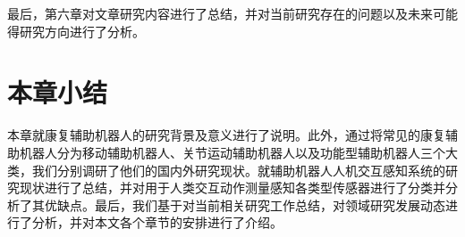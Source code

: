 最后，第六章对文章研究内容进行了总结，并对当前研究存在的问题以及未来可能得研究方向进行了分析。

\section{本章小结}
本章就康复辅助机器人的研究背景及意义进行了说明。此外，通过将常见的康复辅助机器人分为移动辅助机器人、关节运动辅助机器人以及功能型辅助机器人三个大类，我们分别调研了他们的国内外研究现状。就辅助机器人人机交互感知系统的研究现状进行了总结，并对用于人类交互动作测量感知各类型传感器进行了分类并分析了其优缺点。最后，我们基于对当前相关研究工作总结，对领域研究发展动态进行了分析，并对本文各个章节的安排进行了介绍。
